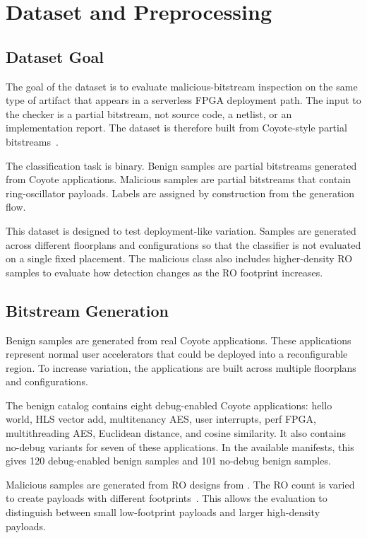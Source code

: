 \chapter{Dataset and Preprocessing}
\label{ch:dataset-preprocessing}

\section{Dataset Goal}
\label{sec:dataset-goal}

The goal of the dataset is to evaluate malicious-bitstream inspection on the same type of artifact that appears in a serverless FPGA deployment path. The input to the checker is a partial bitstream, not source code, a netlist, or an implementation report. The dataset is therefore built from Coyote-style partial bitstreams~\cite{korolija2020os,ramhorst2025coyote}.

The classification task is binary. Benign samples are partial bitstreams generated from Coyote applications. Malicious samples are partial bitstreams that contain ring-oscillator payloads. Labels are assigned by construction from the generation flow.

This dataset is designed to test deployment-like variation. Samples are generated across different floorplans and configurations so that the classifier is not evaluated on a single fixed placement. The malicious class also includes higher-density RO samples to evaluate how detection changes as the RO footprint increases.

\section{Bitstream Generation}
\label{sec:bitstream-generation}

Benign samples are generated from real Coyote applications. These applications represent normal user accelerators that could be deployed into a reconfigurable region. To increase variation, the applications are built across multiple floorplans and configurations.

The benign catalog contains eight debug-enabled Coyote applications: hello world, HLS vector add, multitenancy AES, user interrupts, perf FPGA, multithreading AES, Euclidean distance, and cosine similarity. It also contains no-debug variants for seven of these applications. In the available manifests, this gives 120 debug-enabled benign samples and 101 no-debug benign samples.

Malicious samples are generated from RO designs from \cite{mahmoud2023practical}. The RO count is varied to create payloads with different footprints~\cite{la2020fpgadefender,provelengios2020power,chaudhuri2023criticality}. This allows the evaluation to distinguish between small low-footprint payloads and larger high-density payloads.

